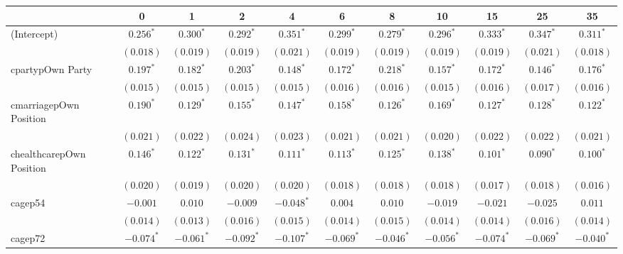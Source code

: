 
\begin{table}
\begin{center}
\begin{tabular}{l c c c c c c c c c c }
\hline
 & 0 & 1 & 2 & 4 & 6 & 8 & 10 & 15 & 25 & 35 \\
\hline
(Intercept)              & $0.256^{*}$  & $0.300^{*}$  & $0.292^{*}$  & $0.351^{*}$  & $0.299^{*}$  & $0.279^{*}$  & $0.296^{*}$  & $0.333^{*}$  & $0.347^{*}$  & $0.311^{*}$  \\
                         & $(0.018)$    & $(0.019)$    & $(0.019)$    & $(0.021)$    & $(0.019)$    & $(0.019)$    & $(0.019)$    & $(0.019)$    & $(0.021)$    & $(0.018)$    \\
cpartypOwn Party         & $0.197^{*}$  & $0.182^{*}$  & $0.203^{*}$  & $0.148^{*}$  & $0.172^{*}$  & $0.218^{*}$  & $0.157^{*}$  & $0.172^{*}$  & $0.146^{*}$  & $0.176^{*}$  \\
                         & $(0.015)$    & $(0.015)$    & $(0.015)$    & $(0.015)$    & $(0.016)$    & $(0.016)$    & $(0.015)$    & $(0.016)$    & $(0.017)$    & $(0.016)$    \\
cmarriagepOwn Position   & $0.190^{*}$  & $0.129^{*}$  & $0.155^{*}$  & $0.147^{*}$  & $0.158^{*}$  & $0.126^{*}$  & $0.169^{*}$  & $0.127^{*}$  & $0.128^{*}$  & $0.122^{*}$  \\
                         & $(0.021)$    & $(0.022)$    & $(0.024)$    & $(0.023)$    & $(0.021)$    & $(0.021)$    & $(0.020)$    & $(0.022)$    & $(0.022)$    & $(0.021)$    \\
chealthcarepOwn Position & $0.146^{*}$  & $0.122^{*}$  & $0.131^{*}$  & $0.111^{*}$  & $0.113^{*}$  & $0.125^{*}$  & $0.138^{*}$  & $0.101^{*}$  & $0.090^{*}$  & $0.100^{*}$  \\
                         & $(0.020)$    & $(0.019)$    & $(0.020)$    & $(0.020)$    & $(0.018)$    & $(0.018)$    & $(0.018)$    & $(0.017)$    & $(0.018)$    & $(0.016)$    \\
cagep54                  & $-0.001$     & $0.010$      & $-0.009$     & $-0.048^{*}$ & $0.004$      & $0.010$      & $-0.019$     & $-0.021$     & $-0.025$     & $0.011$      \\
                         & $(0.014)$    & $(0.013)$    & $(0.016)$    & $(0.015)$    & $(0.014)$    & $(0.015)$    & $(0.014)$    & $(0.014)$    & $(0.016)$    & $(0.014)$    \\
cagep72                  & $-0.074^{*}$ & $-0.061^{*}$ & $-0.092^{*}$ & $-0.107^{*}$ & $-0.069^{*}$ & $-0.046^{*}$ & $-0.056^{*}$ & $-0.074^{*}$ & $-0.069^{*}$ & $-0.040^{*}$ \\

\end{tabular}
\end{center}
\end{table}
